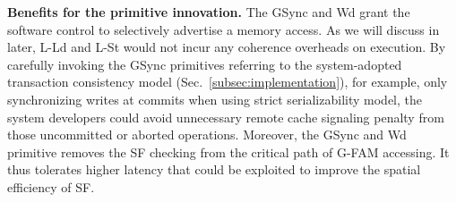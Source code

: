 
\ifx\undefined\stale
\noindent \textbf{Benefits for the primitive innovation. }
The GSync and Wd grant the software control to selectively advertise a memory access. As we will discuss in later, L-Ld and L-St would not incur any coherence overheads on execution. By carefully invoking the GSync primitives referring to the system-adopted transaction consistency model (Sec.~\ref{subsec:implementation}), for example, only synchronizing writes at commits when using strict serializability model, the system developers could avoid unnecessary remote cache signaling penalty from those uncommitted or aborted operations. 
Moreover, the GSync and Wd primitive removes the SF checking from the critical path of G-FAM accessing. It thus tolerates higher latency that could be exploited to improve the spatial efficiency of SF. 
\fi



